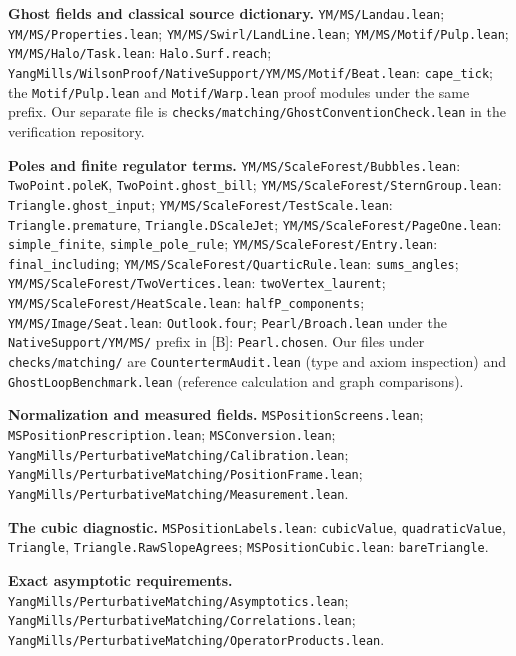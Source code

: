 \documentclass[11pt]{article}
\newcommand{\code}[1]{{\small\nolinkurl{#1}}}
\newcommand{\src}[1]{\textsf{[#1]}}
\begin{document}
\begin{description}[leftmargin=3em,labelwidth=2.6em,align=left]
\item[\src{K}] \textbf{Ghost fields and classical source dictionary.}
\code{YM/MS/Landau.lean}; \code{YM/MS/Properties.lean};
\code{YM/MS/Swirl/LandLine.lean}; \code{YM/MS/Motif/Pulp.lean};
\code{YM/MS/Halo/Task.lean}: \code{Halo.Surf.reach};
\code{YangMills/WilsonProof/NativeSupport/YM/MS/Motif/Beat.lean}:
\code{cape_tick}; the \code{Motif/Pulp.lean} and
\code{Motif/Warp.lean} proof modules under the same prefix.
Our separate file is \code{checks/matching/GhostConventionCheck.lean}
in the verification repository.

\item[\src{S}] \textbf{Poles and finite regulator terms.}
\code{YM/MS/ScaleForest/Bubbles.lean}: \code{TwoPoint.poleK},
\code{TwoPoint.ghost_bill};
\code{YM/MS/ScaleForest/SternGroup.lean}: \code{Triangle.ghost_input};
\code{YM/MS/ScaleForest/TestScale.lean}: \code{Triangle.premature},
\code{Triangle.DScaleJet};
\code{YM/MS/ScaleForest/PageOne.lean}: \code{simple_finite},
\code{simple_pole_rule}; \code{YM/MS/ScaleForest/Entry.lean}:
\code{final_including}; \code{YM/MS/ScaleForest/QuarticRule.lean}:
\code{sums_angles}; \code{YM/MS/ScaleForest/TwoVertices.lean}:
\code{twoVertex_laurent}; \code{YM/MS/ScaleForest/HeatScale.lean}:
\code{halfP_components}; \code{YM/MS/Image/Seat.lean}:
\code{Outlook.four}; \code{Pearl/Broach.lean} under the
\code{NativeSupport/YM/MS/} prefix in [B]: \code{Pearl.chosen}.
Our files under \code{checks/matching/} are \code{CountertermAudit.lean}
(type and axiom inspection) and \code{GhostLoopBenchmark.lean}
(reference calculation and graph comparisons).

\item[\src{N}] \textbf{Normalization and measured fields.}
\code{MSPositionScreens.lean}; \code{MSPositionPrescription.lean};
\code{MSConversion.lean};
\code{YangMills/PerturbativeMatching/Calibration.lean};
\code{YangMills/PerturbativeMatching/PositionFrame.lean};
\code{YangMills/PerturbativeMatching/Measurement.lean}.

\item[\src{C}] \textbf{The cubic diagnostic.}
\code{MSPositionLabels.lean}:
\code{cubicValue}, \code{quadraticValue}, \code{Triangle},
\code{Triangle.RawSlopeAgrees};
\code{MSPositionCubic.lean}: \code{bareTriangle}.

\item[\src{A}] \textbf{Exact asymptotic requirements.}
\code{YangMills/PerturbativeMatching/Asymptotics.lean};
\code{YangMills/PerturbativeMatching/Correlations.lean};
\code{YangMills/PerturbativeMatching/OperatorProducts.lean}.


\end{description}
\end{document}
